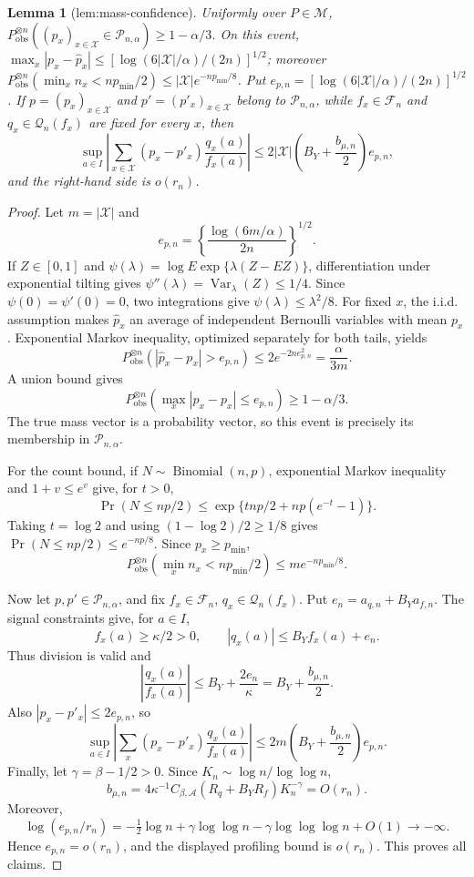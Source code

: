 \documentclass{article}
\newtheorem{lemma}{Lemma}
\begin{document}
\begin{lemma}[lem:mass-confidence]\label{lem:mass-confidence}
Uniformly over \(P\in\mathcal M\), \(P_{\mathrm{obs}}^{\otimes n}((p_x)_{x\in\mathcal X}\in\mathcal P_{n,\alpha})\ge1-\alpha/3\). On this event, \(\max_x|p_x-\widehat p_x|\le[\log(6|\mathcal X|/\alpha)/(2n)]^{1/2}\); moreover \(P_{\mathrm{obs}}^{\otimes n}(\min_xn_x<np_{\min}/2)\le|\mathcal X|e^{-np_{\min}/8}\). Put \(e_{p,n}=[\log(6|\mathcal X|/\alpha)/(2n)]^{1/2}\). If \(p=(p_x)_{x\in\mathcal X}\) and \(p'=(p'_x)_{x\in\mathcal X}\) belong to \(\mathcal P_{n,\alpha}\), while \(f_x\in\mathscr F_n\) and \(q_x\in\mathscr Q_n(f_x)\) are fixed for every \(x\), then \[\sup_{a\in I}\left|\sum_{x\in\mathcal X}(p_x-p'_x)\frac{q_x(a)}{f_x(a)}\right|\le2|\mathcal X|\left(B_Y+\frac{b_{\mu,n}}2\right)e_{p,n},\] and the right-hand side is \(o(r_n)\).
\end{lemma}
\begin{proof}
Let \(m=|\mathcal X|\) and
\[
 e_{p,n}=\left\{\frac{\log(6m/\alpha)}{2n}\right\}^{1/2}.
\]
If \(Z\in[0,1]\) and \(\psi(\lambda)=\log E\exp\{\lambda(Z-EZ)\}\), differentiation under exponential tilting gives \(\psi''(\lambda)=\operatorname{Var}_\lambda(Z)\le1/4\). Since \(\psi(0)=\psi'(0)=0\), two integrations give \(\psi(\lambda)\le\lambda^2/8\). For fixed \(x\), the i.i.d. assumption makes \(\widehat p_x\) an average of independent Bernoulli variables with mean \(p_x\). Exponential Markov inequality, optimized separately for both tails, yields
\[
 P_{\mathrm{obs}}^{\otimes n}(|\widehat p_x-p_x|>e_{p,n})
 \le2e^{-2ne_{p,n}^2}=\frac{\alpha}{3m}.
\]
A union bound gives
\[
 P_{\mathrm{obs}}^{\otimes n}\left(\max_x|\widehat p_x-p_x|\le e_{p,n}\right)\ge1-\alpha/3.
\]
The true mass vector is a probability vector, so this event is precisely its membership in \(\mathcal P_{n,\alpha}\).

For the count bound, if \(N\sim\operatorname{Binomial}(n,p)\), exponential Markov inequality and \(1+v\le e^v\) give, for \(t>0\),
\[
 \Pr(N\le np/2)\le\exp\{tnp/2+np(e^{-t}-1)\}.
\]
Taking \(t=\log2\) and using \((1-\log2)/2\ge1/8\) gives \(\Pr(N\le np/2)\le e^{-np/8}\). Since \(p_x\ge p_{\min}\),
\[
 P_{\mathrm{obs}}^{\otimes n}\left(\min_xn_x<np_{\min}/2\right)
 \le m e^{-np_{\min}/8}.
\]

Now let \(p,p'\in\mathcal P_{n,\alpha}\), and fix \(f_x\in\mathscr F_n\), \(q_x\in\mathscr Q_n(f_x)\). Put \(e_n=a_{q,n}+B_Ya_{f,n}\). The signal constraints give, for \(a\in I\),
\[
 f_x(a)\ge\kappa/2>0,
 \qquad |q_x(a)|\le B_Yf_x(a)+e_n.
\]
Thus division is valid and
\[
 \left|\frac{q_x(a)}{f_x(a)}\right|
 \le B_Y+\frac{2e_n}{\kappa}=B_Y+\frac{b_{\mu,n}}2.
\]
Also \(|p_x-p'_x|\le2e_{p,n}\), so
\[
 \sup_{a\in I}\left|\sum_x(p_x-p'_x)\frac{q_x(a)}{f_x(a)}\right|
 \le2m\left(B_Y+\frac{b_{\mu,n}}2\right)e_{p,n}.
\]
Finally, let \(\gamma=\beta-1/2>0\). Since \(K_n\sim\log n/\log\log n\),
\[
 b_{\mu,n}=4\kappa^{-1}C_{\beta,\mathcal A}(R_q+B_YR_f)K_n^{-\gamma}=O(r_n).
\]
Moreover,
\[
 \log(e_{p,n}/r_n)
 =-\tfrac12\log n+\gamma\log\log n-\gamma\log\log\log n+O(1)\longrightarrow-\infty.
\]
Hence \(e_{p,n}=o(r_n)\), and the displayed profiling bound is \(o(r_n)\). This proves all claims.
\end{proof}
\end{document}

